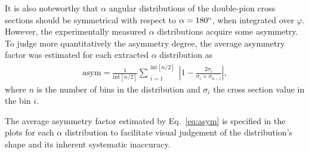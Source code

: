 It is also noteworthy that $\alpha$ angular distributions of the double-pion cross sections should be symmetrical with respect to $\alpha = 180^{\rm o}$, when integrated over $\varphi$. However, the experimentally measured $\alpha$ distributions acquire some asymmetry. To judge more quantitatively the asymmetry degree, the average asymmetry factor was estimated for each extracted $\alpha$ distribution as
\begin{equation}
\begin{aligned}
\textrm{asym} = \frac{1}{\textrm{int} [ n/2]} \sum_{\substack{i = 1}}^{\substack{\textrm{int}[ n/2]}} \left | 1 - \frac{2\sigma_{i}}{\sigma_{i}+\sigma_{n-i}}\right |,
\label{eq:asym}
\end{aligned}
\end{equation}
where $n$ is the number of bins in the distribution and $\sigma_{i}$ the cross section value in the bin $i$.

The average asymmetry factor estimated by Eq.~\eqref{eq:asym} is specified in the plots for each $\alpha$ distribution to facilitate visual judgement of the distribution's shape and its inherent systematic inaccuracy.

